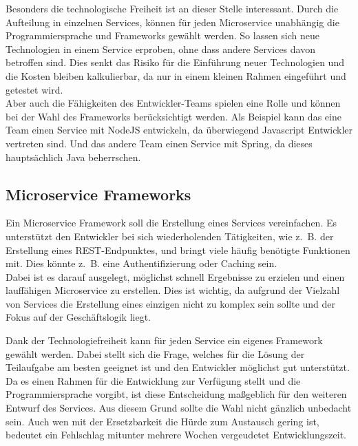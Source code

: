 Besonders die technologische Freiheit ist an dieser Stelle interessant. Durch die Aufteilung in einzelnen Services, können für jeden Microservice unabhängig die Programmiersprache und Frameworks gewählt werden. So lassen sich neue Technologien in einem Service erproben, ohne dass andere Services davon betroffen sind. Dies senkt das Risiko für die Einführung neuer Technologien und die Kosten bleiben kalkulierbar\cite[13]{Wolff2015}, da nur in einem kleinen Rahmen eingeführt und getestet wird.\\ 
Aber auch die Fähigkeiten des Entwickler-Teams spielen eine Rolle und können bei der Wahl des Frameworks berücksichtigt werden. Als Beispiel kann das eine Team einen Service mit NodeJS entwickeln, da überwiegend Javascript Entwickler vertreten sind. Und das andere Team einen Service mit Spring, da dieses hauptsächlich Java beherrschen.

\subsection{Microservice Frameworks}\label{Microservice_Frameworks}

Ein Microservice Framework soll die Erstellung eines Services vereinfachen. Es unterstützt den Entwickler bei sich wiederholenden Tätigkeiten, wie z.~B. der Erstellung eines \ac{REST}-Endpunktes, und bringt viele häufig benötigte Funktionen mit. Dies könnte z.~B. eine Authentifizierung oder Caching sein.\\
Dabei ist es darauf ausgelegt, möglichst schnell Ergebnisse zu erzielen und einen lauffähigen Microservice zu erstellen. Dies ist wichtig, da aufgrund der Vielzahl von Services die Erstellung eines einzigen nicht zu komplex sein sollte und der Fokus auf der Geschäftslogik liegt. 

Dank der Technologiefreiheit kann für jeden Service ein eigenes Framework gewählt werden. Dabei stellt sich die Frage, welches für die Lösung der Teilaufgabe am besten geeignet ist und den Entwickler möglichst gut unterstützt.\\
Da es einen Rahmen für die Entwicklung zur Verfügung stellt und die Programmiersprache vorgibt, ist diese Entscheidung maßgeblich für den weiteren Entwurf des Services. Aus diesem Grund sollte die Wahl nicht gänzlich unbedacht sein. Auch wen mit der Ersetzbarkeit die Hürde zum Austausch gering ist, bedeutet ein Fehlschlag mitunter mehrere Wochen vergeudetet Entwicklungszeit.

